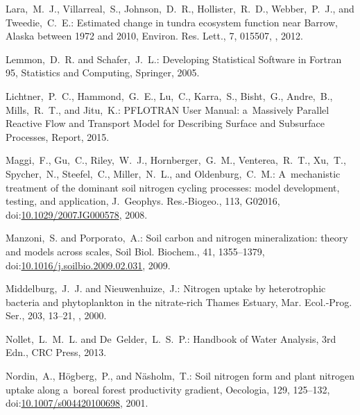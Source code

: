 \documentclass[gmd,noline]{copernicus}
\begin{document}
\begin{thebibliography}{55}
Lara,~M.~J., Villarreal,~S., Johnson,~D.~R., Hollister,~R.~D., Webber,~P.~J., and Tweedie,~C.~E.:
Estimated change in tundra ecosystem function near Barrow, Alaska between 1972 and 2010,
Environ. Res. Lett.,
7, 015507, , 2012.


Lemmon,~D.~R. and Schafer,~J.~L.:
Developing Statistical Software in Fortran 95, Statistics and Computing,
Springer,   2005.


Lichtner,~P.~C., Hammond,~G.~E., Lu,~C., Karra,~S., Bisht,~G., Andre,~B., Mills,~R.~T., and Jitu,~K.:
PFLOTRAN User Manual: a~Massively Parallel Reactive Flow and Transport Model for Describing Surface and Subsurface Processes, Report,
  2015.


Maggi,~F., Gu,~C., Riley,~W.~J., Hornberger,~G.~M., Venterea,~R.~T., Xu,~T., Spycher,~N., Steefel,~C., Miller,~N.~L., and Oldenburg,~C.~M.:
A~mechanistic treatment of the dominant soil nitrogen cycling processes: model development, testing, and application,
J.~Geophys. Res.-Biogeo.,
113, G02016,
doi:\href{http://dx.doi.org/10.1029/2007JG000578}{10.1029/2007JG000578}, 2008.


Manzoni,~S. and Porporato,~A.:
Soil carbon and nitrogen mineralization: theory and models across scales,
Soil Biol. Biochem.,
41, 1355--1379,
doi:\href{http://dx.doi.org/10.1016/j.soilbio.2009.02.031}{10.1016/j.soilbio.2009.02.031}, 2009.


Middelburg,~J.~J. and Nieuwenhuize,~J.:
Nitrogen uptake by heterotrophic bacteria and phytoplankton in the nitrate-rich Thames Estuary,
Mar. Ecol.-Prog. Ser.,
203, 13--21,
,
  2000.


Nollet,~L.~M.~L. and De~Gelder,~L.~S.~P.:
Handbook of Water Analysis, 3rd Edn.,
CRC Press,   2013.


Nordin,~A., H\"{o}gberg,~P., and N\"{a}sholm,~T.:
Soil nitrogen form and plant nitrogen uptake along a~boreal forest productivity gradient,
Oecologia,
129, 125--132,
doi:\href{http://dx.doi.org/10.1007/s004420100698}{10.1007/s004420100698}, 2001.



\end{thebibliography}
\end{document}
